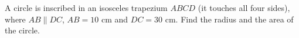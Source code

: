 A circle is inscribed in an isosceles trapezium $ABCD$ (it touches all four sides), where $AB\parallel DC$, $AB=10$ cm and $DC=30$ cm. Find the radius and the area of the circle.
